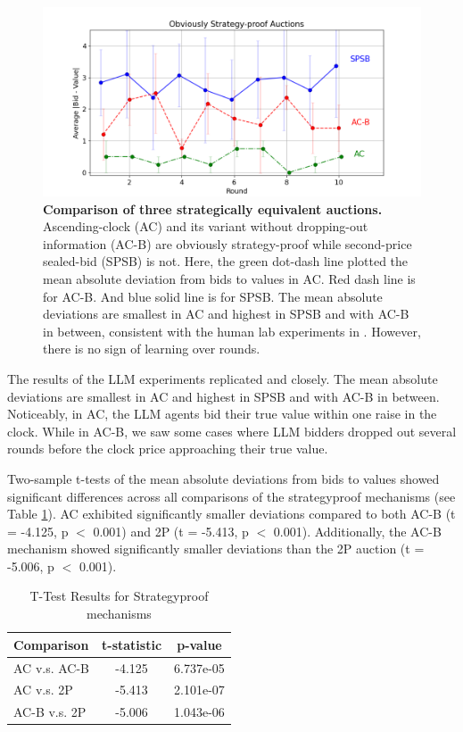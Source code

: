 \documentclass{article} %
\begin{document}
\begin{figure}[h]  
    \centering  
\includegraphics[width=\linewidth]{Figs/OSP.png}  
    \caption{\textbf{Comparison of three strategically equivalent auctions.} Ascending-clock (AC) and its variant without dropping-out information (AC-B) are obviously strategy-proof while second-price sealed-bid (SPSB) is not. Here, the green dot-dash line plotted the mean absolute deviation from bids to values in AC. Red dash line is for AC-B. And blue solid line is for SPSB. The mean absolute deviations are smallest in AC and highest in SPSB and with AC-B in between, consistent with the human lab experiments in \cite{breitmoser2022obviousness}. However, there is no sign of learning over rounds.}
    \label{fig:osp}
\end{figure}




The results of the LLM experiments replicated \cite{li2017obviously} and \citet{breitmoser2022obviousness} closely. The mean absolute deviations are smallest in AC and highest in SPSB and with AC-B in between.
Noticeably, in AC, the LLM agents bid their true value within one raise in the clock. While in AC-B, we saw some cases where LLM bidders dropped out several rounds before the clock price approaching their true value.

Two-sample t-tests of the mean absolute deviations from bids to values showed significant differences across all comparisons of the strategyproof mechanisms (see Table \ref{tab:t-test-results}). AC exhibited significantly smaller deviations compared to both AC-B (t = -4.125, p $<$ 0.001) and 2P (t = -5.413, p $<$ 0.001). Additionally, the AC-B mechanism showed significantly smaller deviations than the 2P auction (t = -5.006, p $<$ 0.001).
\begin{table}[h]
\centering
\begin{tabular}{|l|c|c|}
\hline
\textbf{Comparison} & \textbf{t-statistic} & \textbf{p-value} \\
\hline
AC v.s. AC-B & -4.125 & 6.737e-05 \\
\hline
AC v.s. 2P & -5.413 & 2.101e-07 \\
\hline
AC-B v.s. 2P& -5.006 & 1.043e-06 \\
\hline
\end{tabular}
\caption{T-Test Results for Strategyproof mechanisms }
\label{tab:t-test-results}
\end{table}
\end{document}
